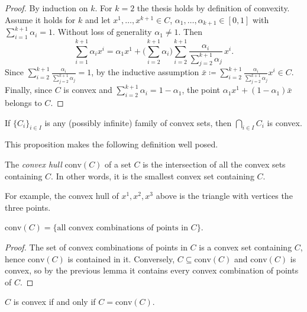 \begin{proof}
By induction on $k$. For $k = 2$ the thesis holds by definition of convexity. Assume it holds for $k$ and let $x^1, \dots, x^{k+1} \in C$, $\alpha_1, \dots, \alpha_{k+1} \in [0,1]$ with $\sum_{i=1}^{k+1} \alpha_i = 1$. Without loss of generality $\alpha_1 \neq 1$. Then
\[
    \sum_{i=1}^{k+1} \alpha_i x^i = \alpha_1 x^1 + \Big(\sum_{i=2}^{k+1} \alpha_i\Big) \sum_{i=2}^{k+1} \frac{\alpha_i}{\sum_{j=2}^{k+1} \alpha_j}\, x^i .
\]
Since $\sum_{i=2}^{k+1} \frac{\alpha_i}{\sum_{j=2}^{k+1} \alpha_j} = 1$, by the inductive assumption $\bar{x} \coloneqq \sum_{i=2}^{k+1} \frac{\alpha_i}{\sum_{j=2}^{k+1} \alpha_j} x^i \in C$. Finally, since $C$ is convex and $\sum_{i=2}^{k+1}\alpha_i = 1 - \alpha_1$, the point $\alpha_1 x^1 + (1-\alpha_1)\bar{x}$ belongs to $C$.
\end{proof}

\begin{proposition}
If $\{C_i\}_{i \in I}$ is any (possibly infinite) family of convex sets, then $\bigcap_{i \in I} C_i$ is convex.
\end{proposition}

This proposition makes the following definition well posed.

\begin{definition}
The \emph{convex hull} $\mathrm{conv}(C)$ of a set $C$ is the intersection of all the convex sets containing $C$. In other words, it is the smallest convex set containing $C$.
\end{definition}

For example, the convex hull of $x^1, x^2, x^3$ above is the triangle with vertices the three points.

\begin{proposition}
$\mathrm{conv}(C) = \{ \text{all convex combinations of points in } C\}$.
\end{proposition}

\begin{proof}
The set of convex combinations of points in $C$ is a convex set containing $C$, hence $\mathrm{conv}(C)$ is contained in it. Conversely, $C \subseteq \mathrm{conv}(C)$ and $\mathrm{conv}(C)$ is convex, so by the previous lemma it contains every convex combination of points of $C$.
\end{proof}

\begin{remark}
$C$ is convex if and only if $C = \mathrm{conv}(C)$.
\end{remark}

